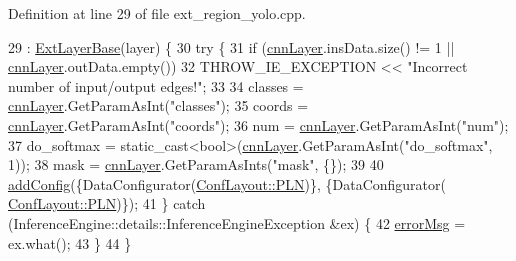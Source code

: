 Definition at line 29 of file ext\+\_\+region\+\_\+yolo.\+cpp.


\begin{DoxyCode}
29                                                   : \hyperlink{classInferenceEngine_1_1Extensions_1_1Cpu_1_1ExtLayerBase_affff0e8263ca26852ccf71d299d7b06a}{ExtLayerBase}(layer) \{
30         \textcolor{keywordflow}{try} \{
31             \textcolor{keywordflow}{if} (\hyperlink{classInferenceEngine_1_1Extensions_1_1Cpu_1_1ExtLayerBase_a1074cdccacb9e9ca6eec01bbc2f7ca4a}{cnnLayer}.insData.size() != 1 || \hyperlink{classInferenceEngine_1_1Extensions_1_1Cpu_1_1ExtLayerBase_a1074cdccacb9e9ca6eec01bbc2f7ca4a}{cnnLayer}.outData.empty())
32                 THROW\_IE\_EXCEPTION << \textcolor{stringliteral}{"Incorrect number of input/output edges!"};
33 
34             classes = \hyperlink{classInferenceEngine_1_1Extensions_1_1Cpu_1_1ExtLayerBase_a1074cdccacb9e9ca6eec01bbc2f7ca4a}{cnnLayer}.GetParamAsInt(\textcolor{stringliteral}{"classes"});
35             coords = \hyperlink{classInferenceEngine_1_1Extensions_1_1Cpu_1_1ExtLayerBase_a1074cdccacb9e9ca6eec01bbc2f7ca4a}{cnnLayer}.GetParamAsInt(\textcolor{stringliteral}{"coords"});
36             num = \hyperlink{classInferenceEngine_1_1Extensions_1_1Cpu_1_1ExtLayerBase_a1074cdccacb9e9ca6eec01bbc2f7ca4a}{cnnLayer}.GetParamAsInt(\textcolor{stringliteral}{"num"});
37             do\_softmax = \textcolor{keyword}{static\_cast<}\textcolor{keywordtype}{bool}\textcolor{keyword}{>}(\hyperlink{classInferenceEngine_1_1Extensions_1_1Cpu_1_1ExtLayerBase_a1074cdccacb9e9ca6eec01bbc2f7ca4a}{cnnLayer}.GetParamAsInt(\textcolor{stringliteral}{"do\_softmax"}, 1));
38             mask = \hyperlink{classInferenceEngine_1_1Extensions_1_1Cpu_1_1ExtLayerBase_a1074cdccacb9e9ca6eec01bbc2f7ca4a}{cnnLayer}.GetParamAsInts(\textcolor{stringliteral}{"mask"}, \{\});
39 
40             \hyperlink{classInferenceEngine_1_1Extensions_1_1Cpu_1_1ExtLayerBase_a0ac7a6632e95b9500d5246b05b4b0bfa}{addConfig}(\{DataConfigurator(\hyperlink{classInferenceEngine_1_1Extensions_1_1Cpu_1_1ExtLayerBase_a1258a8d209e0249e0b1717618352ddfba446687ea2db1ada75be5ed053be77f59}{ConfLayout::PLN})\}, \{DataConfigurator(
      \hyperlink{classInferenceEngine_1_1Extensions_1_1Cpu_1_1ExtLayerBase_a1258a8d209e0249e0b1717618352ddfba446687ea2db1ada75be5ed053be77f59}{ConfLayout::PLN})\});
41         \} \textcolor{keywordflow}{catch} (InferenceEngine::details::InferenceEngineException &ex) \{
42             \hyperlink{classInferenceEngine_1_1Extensions_1_1Cpu_1_1ExtLayerBase_abc78e9b5a79fa339ffd831a5318f71f7}{errorMsg} = ex.what();
43         \}
44     \}
\end{DoxyCode}


